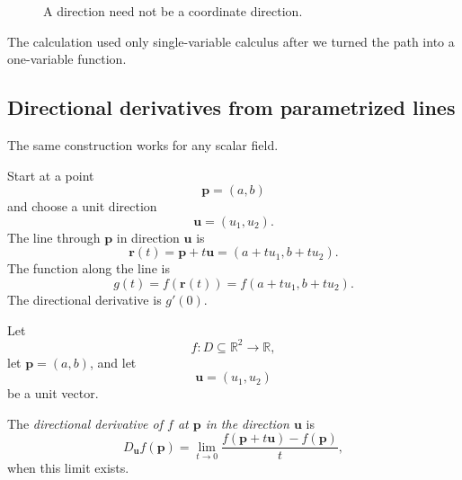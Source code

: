\begin{figure}[h]
\centering
{}
\caption{A direction need not be a coordinate direction.}
\end{figure}

The calculation used only single-variable calculus after we turned the path into a
one-variable function.

\subsection{Directional derivatives from parametrized lines}

The same construction works for any scalar field.

Start at a point
\[
    \mathbf p=(a,b)
\]
and choose a unit direction
\[
    \mathbf u=(u_1,u_2).
\]
The line through \(\mathbf p\) in direction \(\mathbf u\) is
\[
    \mathbf r(t)=\mathbf p+t\mathbf u
    =
    (a+tu_1,b+tu_2).
\]
The function along the line is
\[
    g(t)=f(\mathbf r(t))=f(a+tu_1,b+tu_2).
\]
The directional derivative is \(g'(0)\).

\begin{definition}
Let
\[
    f:D\subseteq\mathbb R^2\to\mathbb R,
\]
let \(\mathbf p=(a,b)\), and let
\[
    \mathbf u=(u_1,u_2)
\]
be a unit vector.

The \emph{directional derivative of \(f\) at \(\mathbf p\) in the direction
\(\mathbf u\)} is
\[
\boxed{
    D_{\mathbf u}f(\mathbf p)
    =
    \lim_{t\to0}
    \frac{f(\mathbf p+t\mathbf u)-f(\mathbf p)}{t},
}
\]
when this limit exists.
\end{definition}

